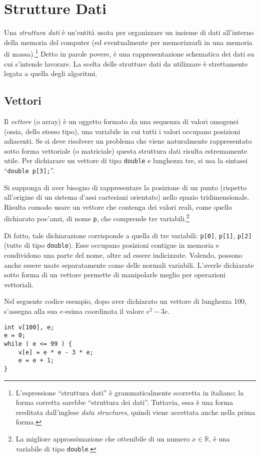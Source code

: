 	\section{Strutture Dati}
Una \emph{struttura dati} è un'entità usata per organizzare un insieme di dati all'interno della memoria del computer (ed eventualmente per memorizzarli in una memoria di massa).\footnote{L'espressione ``struttura dati'' è grammaticalmente scorretta in italiano; la forma corretta sarebbe ``struttura dei dati''.
Tuttavia, essa è una forma ereditata dall'inglese \emph{data structures}, quindi viene accettata anche nella prima forma.}
Detto in parole povere, è una rappresentazione schematica dei dati su cui s'intende lavorare.
La scelta delle strutture dati da utilizzare è strettamente legata a quella degli algoritmi.

		\subsection{Vettori}
		\label{subsec:array}
Il \emph{vettore} (o array) è un oggetto formato da una sequenza di valori omogenei (ossia, dello stesso tipo), una variabile in cui tutti i valori occupano posizioni adiacenti.
Se si deve risolvere un problema che viene naturalmente rappresentato sotto forma vettoriale (o matriciale) questa struttura dati risulta estremamente utile.
Per dichiarare un vettore di tipo \lstinline!double! e lunghezza tre, si usa la sintassi ``\lstinline!double p[3];!''.

Si supponga di aver bisogno di rappresentare la posizione di un punto (rispetto all'origine di un sistema d'assi cartesiani orientato) nello spazio tridimensionale.
Risulta comodo usare un vettore che contenga dei valori reali, come quello dichiarato poc'anzi, di nome \lstinline!p!, che comprende tre variabili.\footnote{La migliore approssimazione che ottenibile di un numero $x\in\mathbb{R}$, è una variabile di tipo \lstinline!double!.}

Di fatto, tale dichiarazione corrisponde a quella di tre variabili: \lstinline!p[0]!, \lstinline!p[1]!, \lstinline!p[2]! (tutte di tipo \lstinline!double!).
Esse occupano posizioni contigue in memoria e condividono una parte del nome, oltre ad essere indicizzate.
Volendo, possono anche essere usate separatamente come delle normali variabili.
L'averle dichiarate sotto forma di un vettore permette di manipolarle meglio per operazioni vettoriali.

Nel seguente codice esempio, dopo aver dichiarato un vettore di lunghezza \num{100}, s'assegna alla sua $e$-esima coordinata il valore $e^2-3e$.
\begin{lstlisting}
int v[100], e;
e = 0;
while ( e <= 99 ) {
	v[e] = e * e - 3 * e;
	e = e + 1;
}
\end{lstlisting}

